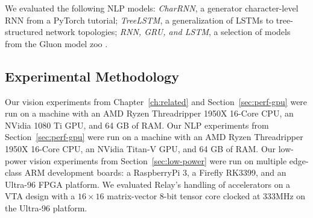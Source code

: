   We evaluated the following NLP models:
    \textit{CharRNN}, a generator character-level
    RNN from a PyTorch tutorial;
    \textit{TreeLSTM}, a generalization of LSTMs to
    tree-structured network topologies;
    \textit{RNN, GRU, and LSTM}, a selection of models from the Gluon
    model zoo
    \citep{pytorch_rnn_tut, tree_lstm, gluon_model_zoo}.

  \subsection{Experimental Methodology}


  Our vision experiments from Chapter~\ref{ch:related} and Section~\ref{sec:perf-gpu} were run on a machine with an AMD Ryzen
    Threadripper 1950X 16-Core CPU,
    an NVidia 1080 Ti GPU,
    and 64 GB of RAM.
  Our NLP experiments from Section~\ref{sec:perf-gpu} were run on a machine with an AMD Ryzen
    Threadripper 1950X 16-Core CPU,
    an NVidia Titan-V GPU,
    and 64 GB of RAM.
  Our low-power vision experiments from Section~\ref{sec:low-power} were run on multiple edge-class ARM development boards: a RaspberryPi 3, a Firefly RK3399, and an Ultra-96 FPGA platform.
  We evaluated Relay's handling of accelerators on a VTA design with a
    $16\times16$ matrix-vector 8-bit tensor core clocked at 333MHz on the Ultra-96 platform.


